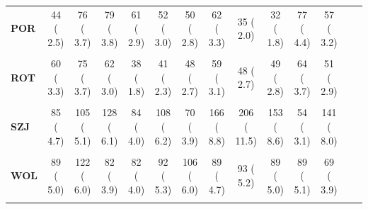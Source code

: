 \documentclass[
]{article}
\begin{document}
\begin{table}[H]
\begin{tabular}[t]{>{\raggedright\arraybackslash}p{5em}ccccccccccccc}
\textbf{POR} & 44 (  2.5) & 76 (  3.7) & 79 (  3.8) & 61 (  2.9) & 52 (  3.0) & 50 (  2.8) & 62 (  3.3) & 35 (  2.0) & 32 (  1.8) & 77 (  4.4) & 57 (  3.2) &  & \\
\textbf{\cellcolor{gray!10}{RAM}} & \cellcolor{gray!10}{86 (  4.8)} & \cellcolor{gray!10}{121 (  5.9)} & \cellcolor{gray!10}{123 (  5.9)} & \cellcolor{gray!10}{109 (  5.3)} & \cellcolor{gray!10}{99 (  5.7)} & \cellcolor{gray!10}{105 (  5.9)} & \cellcolor{gray!10}{103 (  5.5)} & \cellcolor{gray!10}{63 (  3.5)} & \cellcolor{gray!10}{42 (  2.4)} & \cellcolor{gray!10}{64 (  3.7)} & \cellcolor{gray!10}{58 (  3.3)} & \cellcolor{gray!10}{} & \cellcolor{gray!10}{}\\
\textbf{ROT} & 60 (  3.3) & 75 (  3.7) & 62 (  3.0) & 38 (  1.8) & 41 (  2.3) & 48 (  2.7) & 59 (  3.1) & 48 (  2.7) & 49 (  2.8) & 64 (  3.7) & 51 (  2.9) &  & \\
\textbf{\cellcolor{gray!10}{SMC}} & \cellcolor{gray!10}{107 (  6.0)} & \cellcolor{gray!10}{145 (  7.1)} & \cellcolor{gray!10}{132 (  6.3)} & \cellcolor{gray!10}{125 (  6.0)} & \cellcolor{gray!10}{105 (  6.0)} & \cellcolor{gray!10}{110 (  6.2)} & \cellcolor{gray!10}{134 (  7.1)} & \cellcolor{gray!10}{109 (  6.1)} & \cellcolor{gray!10}{121 (  6.8)} & \cellcolor{gray!10}{72 (  4.1)} & \cellcolor{gray!10}{96 (  5.5)} & \cellcolor{gray!10}{} & \cellcolor{gray!10}{}\\
\textbf{SZJ} & 85 (  4.7) & 105 (  5.1) & 128 (  6.1) & 84 (  4.0) & 108 (  6.2) & 70 (  3.9) & 166 (  8.8) & 206 ( 11.5) & 153 (  8.6) & 54 (  3.1) & 141 (  8.0) &  & \\
\textbf{\cellcolor{gray!10}{TEL}} & \cellcolor{gray!10}{124 (  6.9)} & \cellcolor{gray!10}{146 (  7.1)} & \cellcolor{gray!10}{146 (  7.0)} & \cellcolor{gray!10}{168 (  8.1)} & \cellcolor{gray!10}{100 (  5.7)} & \cellcolor{gray!10}{113 (  6.4)} & \cellcolor{gray!10}{119 (  6.3)} & \cellcolor{gray!10}{85 (  4.7)} & \cellcolor{gray!10}{150 (  8.4)} & \cellcolor{gray!10}{131 (  7.5)} & \cellcolor{gray!10}{88 (  5.0)} & \cellcolor{gray!10}{} & \cellcolor{gray!10}{}\\
\textbf{WOL} & 89 (  5.0) & 122 (  6.0) & 82 (  3.9) & 82 (  4.0) & 92 (  5.3) & 106 (  6.0) & 89 (  4.7) & 93 (  5.2) & 89 (  5.0) & 89 (  5.1) & 69 (  3.9) &  & \\
\textbf{\cellcolor{gray!10}{YTL}} & \cellcolor{gray!10}{13 (  0.7)} & \cellcolor{gray!10}{11 (  0.5)} & \cellcolor{gray!10}{16 (  0.8)} & \cellcolor{gray!10}{31 (  1.5)} & \cellcolor{gray!10}{10 (  0.6)} & \cellcolor{gray!10}{1 (  0.1)} & \cellcolor{gray!10}{9 (  0.5)} & \cellcolor{gray!10}{0 (  0.0)} & \cellcolor{gray!10}{10 (  0.6)} & \cellcolor{gray!10}{6 (  0.3)} & \cellcolor{gray!10}{0 (  0.0)} & \cellcolor{gray!10}{} & \cellcolor{gray!10}{}\\

\end{tabular}
\end{table}
\end{document}
